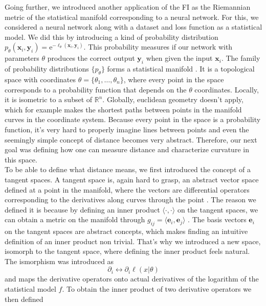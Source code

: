 Going further, we introduced another application of the FI as the Riemannian metric of the statistical manifold corresponding to a neural network. For this, we considered a neural network along with a dataset and loss function as a statistical model. We did this by introducing a kind of probability distribution $p_\theta(\mathbf{x}_i,\mathbf{y}_i) = \mathrm{e}^{-\ell_\theta(\mathbf{x}_i,\mathbf{y}_i)}$. This probability measures if our network with parameters $\theta$ produces the correct output $\mathbf{y}_i$ when given the input $\mathbf{x}_i$. The family of probability distributions $\{p_\theta\}$ forms a statistical manifold \cite{AmarisLectureNotes}. It is a topological space with coordinates $\theta = \{\theta_1, \ldots, \theta_n\}$, where every point in the space corresponds to a probability function that depends on the $\theta$ coordinates. Locally, it is isometric to a subset of $\mathbb{R}^n$. Globally, euclidean geometry doesn't apply, which for example makes the shortest paths between points in the manifold curves in the coordinate system. Because every point in the space is a probability function, it's very hard to properly imagine lines between points and even the seemingly simple concept of distance becomes very abstract. Therefore, our next goal was defining how one can measure distance and characterize curvature in this space.\\
To be able to define what distance means, we first introduced the concept of a tangent spaces. A tangent space is, again hard to grasp, an abstract vector space defined at a point in the manifold, where the vectors are differential operators corresponding to the derivatives along curves through the point \cite{AmarisLectureNotes}. The reason we defined it is because by defining an inner product $\langle \cdot , \cdot \rangle$ on the tangent spaces, we can obtain a metric on the manifold through $g_{ij} = \langle \mathbf{e}_i,\mathbf{e}_j\rangle$ \cite{AmarisLectureNotes}. The basis vectors $\mathbf{e}_i$ on the tangent spaces are abstract concepts, which makes finding an intuitive definition of an inner product non trivial. That's why we introduced a new space, isomorph to the tangent space, where defining the inner product feels natural. The ismorphism was introduced as \cite{AmarisLectureNotes}
\begin{equation}
	\partial_i \leftrightarrow \partial_i \ell(x|\theta)
\end{equation}
and maps the derivative operators onto actual derivatives of the logarithm of the statistical model $f$. To obtain the inner product of two derivative operators we then defined \cite{AmarisLectureNotes}
